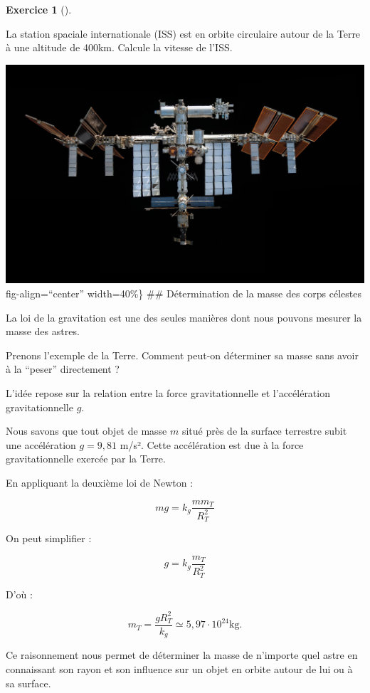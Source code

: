 \documentclass[
  letterpaper,
  DIV=11,
  numbers=noendperiod]{scrartcl}
\theoremstyle{definition}
\theoremstyle{definition}
\theoremstyle{definition}
\newtheorem{exercise}{Exercice}[section]
\theoremstyle{remark}
\begin{document}
\begin{exercise}[]\protect\hypertarget{exr-iss}{}\label{exr-iss}

La station spaciale internationale (ISS) est en orbite circulaire autour
de la Terre à une altitude de 400km. Calcule la vitesse de l'ISS.

\end{exercise}

\includegraphics{figures/grav/iss.pdf}fig-align=``center'' width=40\%\}
\#\# Détermination de la masse des corps célestes

La loi de la gravitation est une des seules manières dont nous pouvons
mesurer la masse des astres.

Prenons l'exemple de la Terre. Comment peut-on déterminer sa masse sans
avoir à la ``peser'' directement ?

L'idée repose sur la relation entre la force gravitationnelle et
l'accélération gravitationnelle \(g\).

Nous savons que tout objet de masse \(m\) situé près de la surface
terrestre subit une accélération \(g = 9,81\) m/s². Cette accélération
est due à la force gravitationnelle exercée par la Terre.

En appliquant la deuxième loi de Newton :

\[
m g =  k_g\frac{m m_T}{R_T^2}
\]

On peut simplifier :

\[
g = k_g\frac{ m_T}{R_T^2}
\]

D'où :

\[
m_T = \frac{g R_T^2}{k_g}\simeq 5,97\cdot 10^{24}\text{kg}.
\]

Ce raisonnement nous permet de déterminer la masse de n'importe quel
astre en connaissant son rayon et son influence sur un objet en orbite
autour de lui ou à sa surface.
\end{document}
